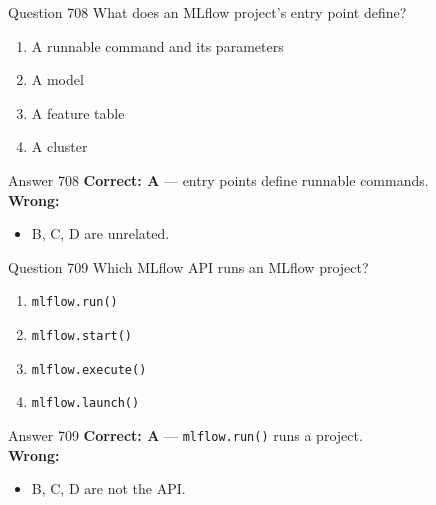 \documentclass[aspectratio=169,11pt]{beamer}
\begin{document}
	\begin{frame}{Question 708}
		What does an MLflow project's entry point define?
		\begin{enumerate}[label=\Alph*.]
			\item A runnable command and its parameters
			\item A model
			\item A feature table
			\item A cluster
		\end{enumerate}
	\end{frame}
	\begin{frame}{Answer 708}
		\textbf{Correct: A} --- entry points define runnable commands.\\
		\vspace{0.5em}
		\textbf{Wrong:}
		\begin{itemize}
			\item B, C, D are unrelated.
		\end{itemize}
	\end{frame}
	
	\begin{frame}{Question 709}
		Which MLflow API runs an MLflow project?
		\begin{enumerate}[label=\Alph*.]
			\item \texttt{mlflow.run()}
			\item \texttt{mlflow.start()}
			\item \texttt{mlflow.execute()}
			\item \texttt{mlflow.launch()}
		\end{enumerate}
	\end{frame}
	\begin{frame}{Answer 709}
		\textbf{Correct: A} --- \texttt{mlflow.run()} runs a project.\\
		\vspace{0.5em}
		\textbf{Wrong:}
		\begin{itemize}
			\item B, C, D are not the API.
		\end{itemize}
	\end{frame}
	
\end{document}
